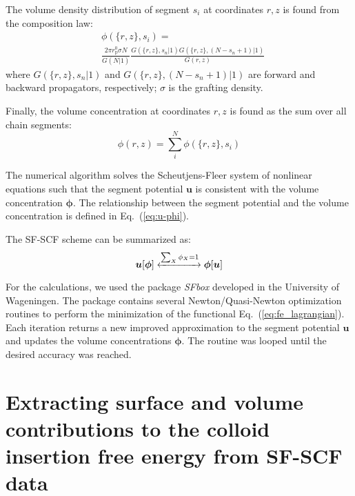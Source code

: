 \documentclass[10pt, a4paper]{article}
\begin{document}
\begin{multicols}{2}
The volume density distribution of segment $s_i$ at coordinates $r, z$ is found from the composition law:
\begin{equation}
    \label{eq:propagation}
    \begin{aligned}
        &\phi(\{r, z\}, s_i) = \\
        &\frac{2 \pi r_{\text{p}}^{0} \sigma N}{G(N|1)}
        \frac{G(\{r, z\}, s_n | 1) G(\{r, z\}, (N - s_n + 1) | 1)}{G(r, z)}
    \end{aligned}
\end{equation}
where $G(\{r, z\}, s_n | 1)$ and $G(\{r, z\}, (N - s_n + 1) | 1)$ are forward and backward propagators, respectively; $\sigma$ is the grafting density.

Finally, the volume concentration at coordinates $r, z$ is found as the sum over all chain segments:
\begin{equation}
    \phi(r, z) = \sum_{i}^{N} \phi(\{r, z\}, s_i)
\end{equation}

The numerical algorithm solves the Scheutjens-Fleer system of nonlinear equations such that the segment potential $\bm{u}$ is consistent with the volume concentration $\boldsymbol{\phi}$.
The relationship between the segment potential and the volume concentration is defined in Eq.~(\ref{eq:u-phi}).

The SF-SCF scheme can be summarized as:
\begin{equation}
    \boldsymbol{u}[\boldsymbol{\phi}] \xleftrightarrow[]{\sum_{X} \phi_X = 1} \boldsymbol{\phi}[\boldsymbol{u}]
\end{equation}

For the calculations, we used the package \emph{SFbox} developed in the University of Wageningen.
The package contains several Newton/Quasi-Newton optimization routines to perform the minimization of the functional Eq.~(\ref{eq:fe_lagrangian}).
Each iteration returns a new improved approximation to the segment potential $\bm{u}$ and updates the volume concentrations $\bm{\phi}$.
The routine was looped until the desired accuracy was reached.

\end{multicols}


\section{Extracting surface and volume contributions to the colloid insertion free energy from SF-SCF data}
\end{document}
